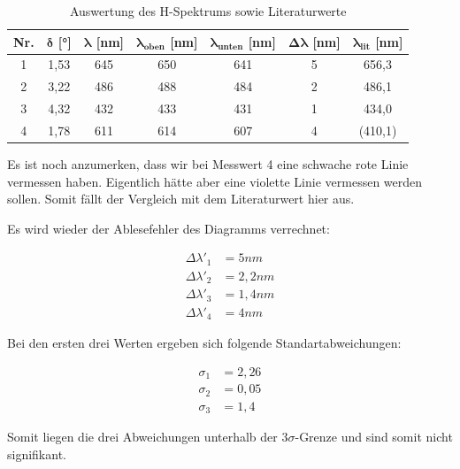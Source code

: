 \documentclass{article}
\begin{document}
\begin{table}[h]
\centering
\caption{Auswertung des H-Spektrums sowie Literaturwerte}
\begin{tabular}{c|c|c|c|c|c|c}
\textbf{Nr.} & $\bm{\delta}$ [°] & $\bm{\lambda}$ [nm] & $\bm{\lambda_{oben}}$ [nm] & $\bm{\lambda_{unten}}$ [nm] & $\bm{\Delta \lambda}$ [nm] & $\bm{\lambda_{lit}}$ [nm] \\ \hline
       1   &      1,53     &      645     &      650     &      641     &     5      &     656,3      \\
       2   &      3,22     &      486     &      488     &      484     &     2      &     486,1      \\
       3   &      4,32     &      432     &      433     &      431     &     1      &     434,0      \\
       4   &      1,78     &      611     &      614     &      607     &     4      &     (410,1)   
\end{tabular}
\end{table}

Es ist noch anzumerken, dass wir bei Messwert 4 eine schwache rote Linie vermessen haben. Eigentlich hätte aber eine violette Linie vermessen werden sollen. Somit fällt der Vergleich mit dem Literaturwert hier aus.

Es wird wieder der Ablesefehler des Diagramms verrechnet:

\begin{equation}
    \begin{split}
        \Delta \lambda'_1 &= 5nm\\
        \Delta \lambda'_2 &= 2,2nm\\
        \Delta \lambda'_3 &= 1,4nm\\
        \Delta \lambda'_4 &= 4nm
    \end{split}
\end{equation}

Bei den ersten drei Werten ergeben sich folgende Standartabweichungen:

\begin{equation}
    \begin{split}
        \sigma_1 &= 2,26 \\
        \sigma_2 &= 0,05 \\
        \sigma_3 &= 1,4
    \end{split}
\end{equation}

Somit liegen die drei Abweichungen unterhalb der $3\sigma$-Grenze und sind somit nicht signifikant.
\end{document}
